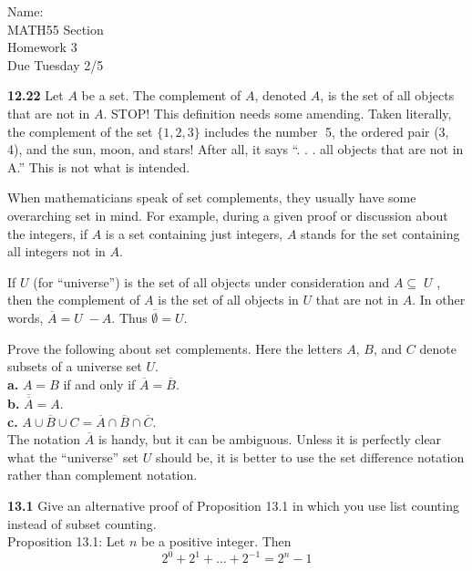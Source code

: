 \documentclass[10pt]{article}
\newcommand{\cmp}[1]{\overline{#1}}
\begin{document}
\begin{flushright}
	Name: \underline{\hspace{3cm}} \\
	MATH55 Section \underline{\hspace{0.5cm}} \\
	Homework 3 \\
	Due Tuesday 2/5
\end{flushright}

\begin{framed}
    \textbf{12.22} Let $A$ be a set. The complement of $A$, denoted $A$, is the set of all objects that are not in $A$. STOP! 
    This definition needs some amending. Taken literally, the complement of the set $\{1, 2, 3\}$ 
    includes the number 􏰏5, the ordered pair (3, 4), and the sun, moon, and stars! After all, it says “. . . all objects that are not in A.” 
    This is not what is intended.

    When mathematicians speak of set complements, they usually have some overarching set in mind. 
    For example, during a given proof or discussion about the integers, if $A$ is a set containing just integers, 
    $A$ stands for the set containing all integers not in $A$.

    If $U$ (for “universe”) is the set of all objects under consideration and $A\subseteq􏰁 U$ , then the complement of $A$ is the set of 
    all objects in $U$ that are not in $A$. In other words, $\cmp{A} = U 􏰏- A$. Thus $\cmp{\emptyset} = U$.

    Prove the following about set complements. Here the letters $A$, $B$, and $C$ denote subsets of a universe set $U$.\\

    \indent \textbf{a.} $A=B$ if and only if $\cmp{A} = \cmp{B}$.\\
    \indent \textbf{b.} $\cmp{\cmp{A}} = A$.\\
    \indent \textbf{c.} $\cmp{A \cup B \cup C} = \cmp{A} \cap \cmp{B} \cap \cmp{C}$.\\

    The notation $\cmp{A}$ is handy, but it can be ambiguous. 
    Unless it is perfectly clear what the “universe” set $U$ should be, 
    it is better to use the set difference notation rather than complement notation.
\end{framed}

\pagebreak

\begin{framed}
    \textbf{13.1} Give an alternative proof of Proposition 13.1 in which you use list counting instead of subset counting.\\

    Proposition 13.1: Let $n$ be a positive integer. Then
    $$
    2^0+2^1+...+2^{-1} = 2^n-1
    $$
\end{framed}
\end{document}
